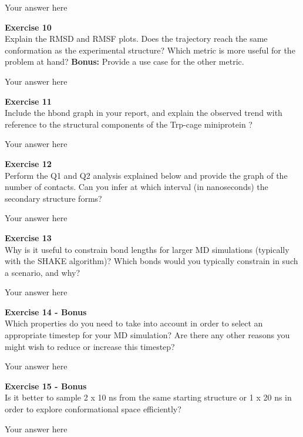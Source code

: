 \documentclass{article}
\begin{document}
Your answer here

\begin{mdframed}
\textbf{Exercise 10}\\
Explain the RMSD and RMSF plots.  Does the trajectory reach the same conformation as the experimental structure?
Which metric is more useful for the problem at hand? \textbf{Bonus:}  Provide a use case for the other metric.
\end{mdframed}

Your answer here

\begin{mdframed}
\textbf{Exercise 11}\\
Include the hbond graph in your report, and explain the observed trend with reference to the structural components of the Trp-cage miniprotein ?
\end{mdframed}

Your answer here

\begin{mdframed}
\textbf{Exercise 12}\\
Perform the Q1 and Q2 analysis explained below and provide the graph of the number of contacts. Can you infer at which interval (in nanoseconds) the secondary structure forms?
\end{mdframed}

Your answer here

\begin{mdframed}
\textbf{Exercise 13}\\
Why is it useful to constrain bond lengths for larger MD simulations (typically with the SHAKE algorithm)? Which bonds would you typically constrain in such a scenario, and why?
\end{mdframed}

Your answer here

\begin{mdframed}
\textbf{Exercise 14 - Bonus}\\
Which properties do you need to take into account in order to select an appropriate timestep for your MD simulation? Are there any other reasons you might wish to reduce or increase this timestep?
\end{mdframed}

Your answer here

\begin{mdframed}
\textbf{Exercise 15 - Bonus}\\
Is it better to sample 2 x 10 ns from the same starting structure or 1 x 20 ns in order to explore conformational space efficiently?
\end{mdframed}

Your answer here

\end{document}
